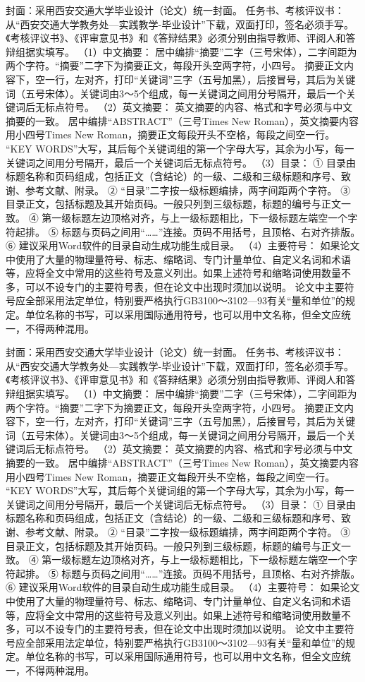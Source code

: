 \documentclass[Mac]{xjtuBSThesis}  %
\begin{document}
封面：采用西安交通大学毕业设计（论文）统一封面。
任务书、考核评议书：从“西安交通大学教务处—实践教学-毕业设计”下载，双面打印，签名必须手写。《考核评议书》、《评审意见书》和《答辩结果》必须分别由指导教师、评阅人和答辩组据实填写。
（1）中文摘要：
居中编排“摘要”二字（三号宋体），二字间距为两个字符。“摘要”二字下为摘要正文，每段开头空两字符，小四号。
摘要正文内容下，空一行，左对齐，打印“关键词”三字（五号加黑），后接冒号，其后为关键词（五号宋体）。关键词由3～5个组成，每一关键词之间用分号隔开，最后一个关键词后无标点符号。
（2）英文摘要：
英文摘要的内容、格式和字号必须与中文摘要的一致。
居中编排“ABSTRACT”（三号Times New Roman），英文摘要内容用小四号Times New Roman，摘要正文每段开头不空格，每段之间空一行。
“KEY WORDS”大写，其后每个关键词组的第一个字母大写，其余为小写，每一关键词之间用分号隔开，最后一个关键词后无标点符号。
（3）目录：
① 目录由标题名称和页码组成，包括正文（含结论）的一级、二级和三级标题和序号、致谢、参考文献、附录。
② “目录”二字按一级标题编排，两字间距两个字符。
③ 目录正文，包括标题及其开始页码。一般只列到三级标题，标题的编号与正文一致。
④ 第一级标题左边顶格对齐，与上一级标题相比，下一级标题左端空一个字符起排。
⑤ 标题与页码之间用“……”连接。页码不用括号，且顶格、右对齐排版。
⑥ 建议采用Word软件的目录自动生成功能生成目录。
（4）主要符号：
如果论文中使用了大量的物理量符号、标志、缩略词、专门计量单位、自定义名词和术语等，应将全文中常用的这些符号及意义列出。如果上述符号和缩略词使用数量不多，可以不设专门的主要符号表，但在论文中出现时须加以说明。
论文中主要符号应全部采用法定单位，特别要严格执行GB3100～3102—93有关“量和单位”的规定。单位名称的书写，可以采用国际通用符号，也可以用中文名称，但全文应统一，不得两种混用。

封面：采用西安交通大学毕业设计（论文）统一封面。
任务书、考核评议书：从“西安交通大学教务处—实践教学-毕业设计”下载，双面打印，签名必须手写。《考核评议书》、《评审意见书》和《答辩结果》必须分别由指导教师、评阅人和答辩组据实填写。
（1）中文摘要：
居中编排“摘要”二字（三号宋体），二字间距为两个字符。“摘要”二字下为摘要正文，每段开头空两字符，小四号。
摘要正文内容下，空一行，左对齐，打印“关键词”三字（五号加黑），后接冒号，其后为关键词（五号宋体）。关键词由3～5个组成，每一关键词之间用分号隔开，最后一个关键词后无标点符号。
（2）英文摘要：
英文摘要的内容、格式和字号必须与中文摘要的一致。
居中编排“ABSTRACT”（三号Times New Roman），英文摘要内容用小四号Times New Roman，摘要正文每段开头不空格，每段之间空一行。
“KEY WORDS”大写，其后每个关键词组的第一个字母大写，其余为小写，每一关键词之间用分号隔开，最后一个关键词后无标点符号。
（3）目录：
① 目录由标题名称和页码组成，包括正文（含结论）的一级、二级和三级标题和序号、致谢、参考文献、附录。
② “目录”二字按一级标题编排，两字间距两个字符。
③ 目录正文，包括标题及其开始页码。一般只列到三级标题，标题的编号与正文一致。
④ 第一级标题左边顶格对齐，与上一级标题相比，下一级标题左端空一个字符起排。
⑤ 标题与页码之间用“……”连接。页码不用括号，且顶格、右对齐排版。
⑥ 建议采用Word软件的目录自动生成功能生成目录。
（4）主要符号：
如果论文中使用了大量的物理量符号、标志、缩略词、专门计量单位、自定义名词和术语等，应将全文中常用的这些符号及意义列出。如果上述符号和缩略词使用数量不多，可以不设专门的主要符号表，但在论文中出现时须加以说明。
论文中主要符号应全部采用法定单位，特别要严格执行GB3100～3102—93有关“量和单位”的规定。单位名称的书写，可以采用国际通用符号，也可以用中文名称，但全文应统一，不得两种混用。
\end{document}
